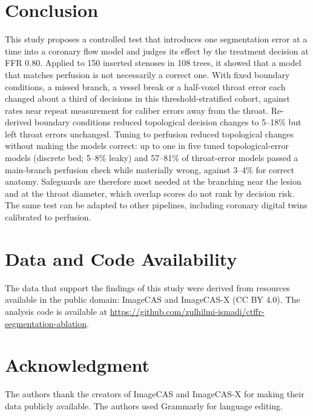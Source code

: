 \documentclass[journal,twoside,web]{ieeecolor}
\begin{document}
\section{Conclusion}
This study proposes a controlled test that introduces one segmentation error at a time into a coronary flow model and judges
its effect by the treatment decision at FFR 0.80. Applied to 150 inserted stenoses in 108 trees, it showed that a model that matches
perfusion is not necessarily a correct one. With fixed boundary conditions, a missed branch, a vessel break or a half-voxel throat error each changed about a
third of decisions in this threshold-stratified cohort, against rates near repeat measurement for caliber errors
away from the throat. Re-derived boundary conditions reduced topological decision changes to 5--18\% but left
throat errors unchanged. Tuning to perfusion reduced topological changes without making the models correct: up to
one in five tuned topological-error models (discrete bed; 5--8\% leaky) and 57--81\% of throat-error models passed a
main-branch perfusion check while materially wrong, against 3--4\% for correct anatomy. Safeguards are therefore most
needed at the branching near the lesion and at the throat diameter, which overlap scores do not rank by decision risk.
The same test can be adapted to other
pipelines, including coronary digital twins calibrated to perfusion.

\section*{Data and Code Availability}
The data that support the findings of this study were derived from resources available in the public domain: ImageCAS \cite{zeng2023} and ImageCAS-X \cite{imagecasx_data} (CC BY 4.0). The analysis code is available at \url{https://github.com/zulhilmi-ismadi/ctffr-segmentation-ablation}.

\section*{Acknowledgment}
The authors thank the creators of ImageCAS and ImageCAS-X for making their data publicly available. The authors
used Grammarly for language editing.



\end{document}
